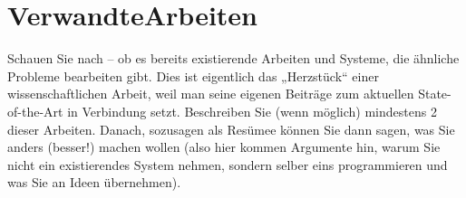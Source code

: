 \chapter{VerwandteArbeiten}

Schauen Sie nach – ob es bereits existierende Arbeiten und Systeme, die ähnliche Probleme bearbeiten gibt. Dies ist eigentlich das „Herzstück“ einer wissenschaftlichen Arbeit, weil man seine eigenen Beiträge zum aktuellen State-of-the-Art in  
Verbindung setzt.  
Beschreiben Sie (wenn möglich) mindestens 2 dieser Arbeiten. Danach, sozusagen als Resümee können Sie dann sagen, was Sie anders (besser!) machen wollen (also hier kommen Argumente hin, warum Sie nicht ein existierendes System nehmen, sondern selber eins programmieren und was Sie an Ideen übernehmen).  